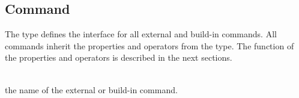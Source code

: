 \subsection{Command} 

%

The  type defines the interface for all external and
build-in commands. All commands inherit the properties and operators
from the  type.
The function of the properties and operators is described
in the next sections.

\begin{asparadesc}
%
\item[\code{theName}] \hfill \\
the name of the external or build-in command.
%
\end{asparadesc}


